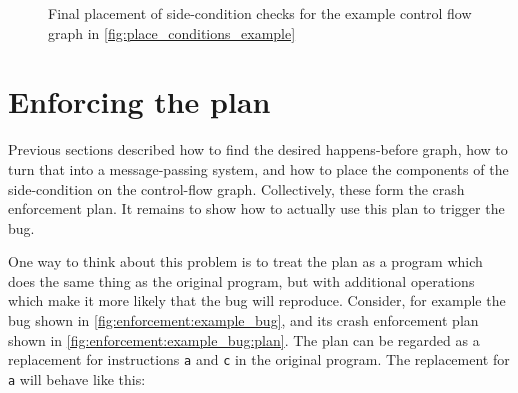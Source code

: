 \begin{figure}
  \caption{Final placement of side-condition checks for the example
    control flow graph in \autoref{fig:place_conditions_example}}
  \label{fig:place_conditions_example:result}
\end{figure}

\section{Enforcing the plan}
\label{sect:enforce:interpreting}

Previous sections described how to find the desired happens-before
graph, how to turn that into a message-passing system, and how to
place the components of the side-condition on the control-flow graph.
Collectively, these form the crash enforcement plan.  It remains to
show how to actually use this plan to trigger the bug.

One way to think about this problem is to treat the plan as a program
which does the same thing as the original program, but with additional
operations which make it more likely that the bug will reproduce.
Consider, for example the bug shown in
\autoref{fig:enforcement:example_bug}, and its crash enforcement
plan shown in \autoref{fig:enforcement:example_bug:plan}.  The plan
can be regarded as a replacement for instructions {\tt a} and {\tt c}
in the original program.  The replacement for {\tt a} will behave like
this:

